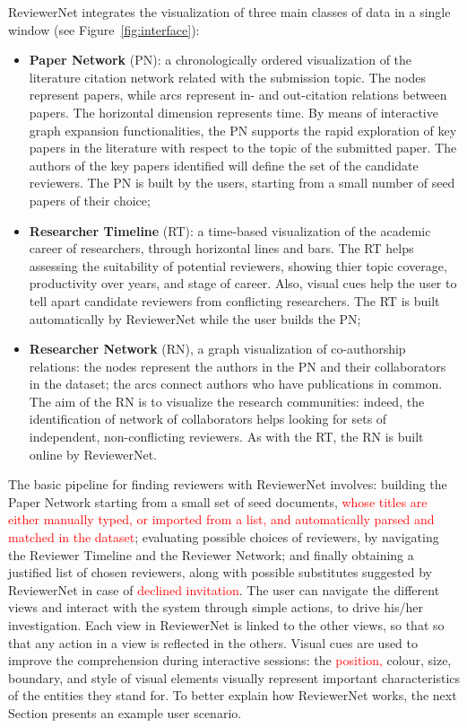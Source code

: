 ReviewerNet integrates the visualization of three main classes of data in a single window (see Figure~\ref{fig:interface}):

\begin{itemize}
\item  {\bf Paper Network} (PN): a chronologically ordered visualization of the literature citation network related with the submission topic. The nodes represent papers, while arcs represent in- and out-citation relations between papers. The horizontal dimension represents time. By means of interactive graph expansion functionalities, the PN supports the rapid exploration of key papers in the literature with respect to the topic of the submitted paper. The authors of the key papers identified will define the set of the candidate reviewers. The PN is built by the users, starting from a small number of seed papers of their choice;
\item  {\bf Researcher Timeline} (RT): a time-based visualization of the academic career of researchers, through horizontal lines and bars. The RT helps assessing the suitability of potential reviewers, showing thier topic coverage, productivity over years, and stage of career. Also, visual cues help the user to tell apart candidate reviewers from conflicting researchers. The RT is built automatically by ReviewerNet while the user builds the PN;
\item  {\bf Researcher Network} (RN), a graph visualization of co-authorship relations: the nodes represent the authors in the PN and their collaborators in the dataset; the arcs connect authors who have publications in common. The aim of the RN is to visualize the research communities: indeed, the identification of network of collaborators helps looking for sets of independent, non-conflicting reviewers. As with the RT, the RN is built online by ReviewerNet.
\end{itemize}
%
The basic pipeline for finding reviewers with ReviewerNet involves: building the Paper Network starting from a small set of seed documents, \textcolor{red}{whose titles are either manually typed, or imported from a list, and automatically parsed and matched in the dataset}; evaluating possible choices of reviewers, by navigating the Reviewer Timeline and the Reviewer Network; and finally obtaining a justified list of chosen reviewers, along with possible substitutes suggested by ReviewerNet in case of \textcolor{red}{declined invitation}. The user can navigate the different views and interact with the system through simple actions, to drive his/her investigation. Each view in ReviewerNet is linked to the other views, so that so that any action in a view is reflected in the others. Visual cues are used to improve the comprehension during interactive sessions: the \textcolor{red}{position,} colour, size, boundary, and style of visual elements visually represent important characteristics of the entities they stand for. To better explain how ReviewerNet works, the next Section presents an example user scenario. %

